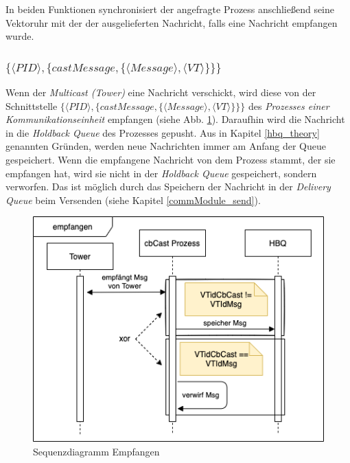 In beiden Funktionen synchronisiert der angefragte Prozess anschließend seine Vektoruhr mit der der ausgelieferten Nachricht, falls eine Nachricht empfangen wurde.

\subsubsection{$\{\langle PID \rangle,\{castMessage,\{\langle Message \rangle, \langle VT \rangle\}\}\}$}

Wenn der \textit{Multicast (Tower)} eine Nachricht verschickt, wird diese von der Schnittstelle $\{\langle PID \rangle,\{castMessage,\{\langle Message \rangle, \langle VT \rangle\}\}\}$ des \textit{Prozesses einer Kommunikationseinheit} empfangen (siehe Abb. \ref{fig:sequence_cbCast_cbcast}). Daraufhin wird die Nachricht in die \textit{Holdback Queue} des Prozesses gepusht. Aus in  Kapitel \ref{hbq_theory} genannten Gründen, werden neue Nachrichten immer am Anfang der Queue gespeichert. Wenn die empfangene Nachricht von dem Prozess stammt, der sie empfangen hat, wird sie nicht in der \textit{Holdback Queue} gespeichert, sondern verworfen. Das ist möglich durch das Speichern der Nachricht in der \textit{Delivery Queue} beim Versenden (siehe Kapitel \ref{commModule_send}).

\begin{figure}[htbp]
\begin{center}
\includegraphics[scale=0.5]{Latex/Bilder/Sequenz_empfangen.png}
\caption{\label{fig:sequence_cbCast_cbcast} Sequenzdiagramm Empfangen}
\end{center}
\end{figure}

